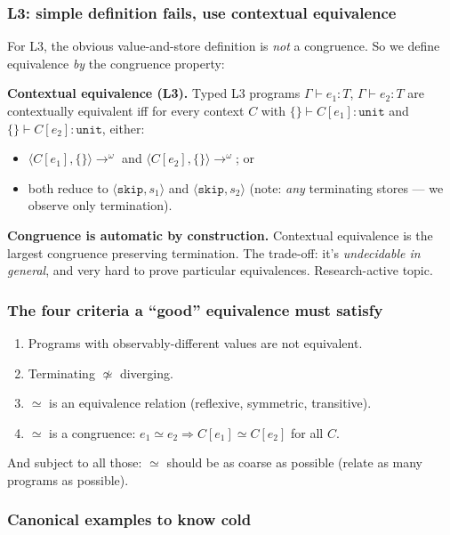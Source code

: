 \documentclass[11pt,a4paper]{article}
\begin{document}
\subsubsection*{L3: simple definition fails, use contextual equivalence}

For L3, the obvious value-and-store definition is \emph{not} a congruence. So we define equivalence \emph{by} the congruence property:

\textbf{Contextual equivalence (L3).} Typed L3 programs $\Gamma \vdash e_1 : T$, $\Gamma \vdash e_2 : T$ are contextually equivalent iff for every context $C$ with $\{\} \vdash C[e_1] : \texttt{unit}$ and $\{\} \vdash C[e_2] : \texttt{unit}$, either:
\begin{itemize}[leftmargin=*,itemsep=0pt]
  \item[(a)] $\langle C[e_1], \{\}\rangle \to^\omega$ and $\langle C[e_2], \{\}\rangle \to^\omega$; or
  \item[(b)] both reduce to $\langle \texttt{skip}, s_1\rangle$ and $\langle \texttt{skip}, s_2\rangle$ (note: \emph{any} terminating stores --- we observe only termination).
\end{itemize}

\textbf{Congruence is automatic by construction.} Contextual equivalence is the largest congruence preserving termination. The trade-off: it's \emph{undecidable in general}, and very hard to prove particular equivalences. Research-active topic.

\subsubsection*{The four criteria a ``good'' equivalence must satisfy}

\begin{enumerate}[leftmargin=*,itemsep=1pt]
  \item Programs with observably-different values are not equivalent.
  \item Terminating $\not\simeq$ diverging.
  \item $\simeq$ is an equivalence relation (reflexive, symmetric, transitive).
  \item $\simeq$ is a congruence: $e_1 \simeq e_2 \Rightarrow C[e_1] \simeq C[e_2]$ for all $C$.
\end{enumerate}
And subject to all those: $\simeq$ should be as coarse as possible (relate as many programs as possible).

\subsubsection*{Canonical examples to know cold}
\end{document}
